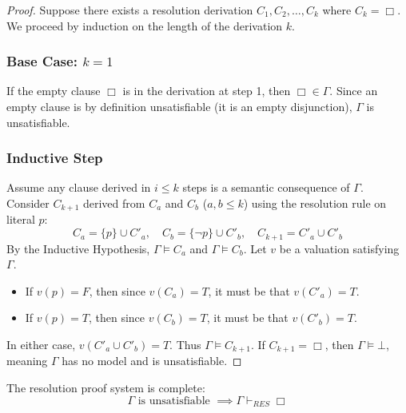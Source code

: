 \documentclass{article}
\newtheorem{theorem}{Theorem}[section]
\let\oldtheorem\theorem
\let\endoldtheorem\endtheorem
\renewenvironment{theorem}
  {\begin{tcolorbox}[
      colback=yellow!6,
      colframe=yellow!60!black,
      boxrule=0.6pt,
      arc=2pt,
      left=6pt,right=6pt,top=4pt,bottom=4pt,
      parbox=false
    ]\oldtheorem}
  {\endoldtheorem\end{tcolorbox}}
\begin{document}
\begin{proof}
    Suppose there exists a resolution derivation $C_1, C_2, \dots, C_k$ where $C_k = \Box$. We proceed by induction on the length of the derivation $k$.
    
    \subsubsection*{Base Case: $k=1$}
    If the empty clause $\Box$ is in the derivation at step 1, then $\Box \in \Gamma$. Since an empty clause is by definition unsatisfiable (it is an empty disjunction), $\Gamma$ is unsatisfiable.

    \subsubsection*{Inductive Step}
    Assume any clause derived in $i \leq k$ steps is a semantic consequence of $\Gamma$. Consider $C_{k+1}$ derived from $C_a$ and $C_b$ ($a, b \leq k$) using the resolution rule on literal $p$:
    \[ C_a = \{p\} \cup C'_a, \quad C_b = \{\neg p\} \cup C'_b, \quad C_{k+1} = C'_a \cup C'_b \]
    By the Inductive Hypothesis, $\Gamma \models C_a$ and $\Gamma \models C_b$. Let $v$ be a valuation satisfying $\Gamma$. 
    \begin{itemize}
        \item If $v(p) = F$, then since $v(C_a) = T$, it must be that $v(C'_a) = T$.
        \item If $v(p) = T$, then since $v(C_b) = T$, it must be that $v(C'_b) = T$.
    \end{itemize}
    In either case, $v(C'_a \cup C'_b) = T$. Thus $\Gamma \models C_{k+1}$. If $C_{k+1} = \Box$, then $\Gamma \models \bot$, meaning $\Gamma$ has no model and is unsatisfiable.
\end{proof}



\begin{theorem}[Completeness]
    The resolution proof system is complete:
    \[ \Gamma \text{ is unsatisfiable } \implies \Gamma \vdash_{RES} \Box \]
\end{theorem}
\end{document}
